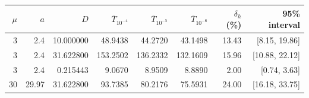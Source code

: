 \begin{tabular}{rrrrrrrr}
\toprule
$\mu$ & $a$ & $D$ & $\overline T_{10^{-4}}$ & $\overline T_{10^{-5}}$ & $\overline T_{10^{-6}}$ & $\delta_h$ (\%) & 95\% interval \\
\midrule
3 & 2.4 & 10.000000 & 48.9438 & 44.2720 & 43.1498 & 13.43 & [8.15, 19.86] \\
3 & 2.4 & 31.622800 & 153.2502 & 136.2332 & 132.1609 & 15.96 & [10.88, 22.12] \\
3 & 2.4 & 0.215443 & 9.0670 & 8.9509 & 8.8890 & 2.00 & [0.74, 3.63] \\
30 & 29.97 & 31.622800 & 93.7385 & 80.2176 & 75.5931 & 24.00 & [16.18, 33.75] \\
\bottomrule
\end{tabular}
